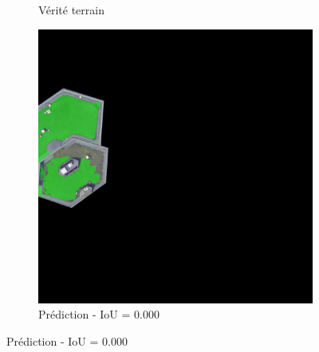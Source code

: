 \begin{figure}[H]
\begin{subfigure}{0.32\textwidth}
    \caption{Vérité terrain}
\end{subfigure}
\hfill
\begin{subfigure}{0.32\textwidth}
    \includegraphics[width=\textwidth]{02-main//figures/ch4/kfold_ensembles/segformer_tu-regnety_080.ra3_in1k/worst_cases/worst_4_iou0.000_25001117_tile_3_9_5ba8f7_overlay_pred.png}
    \caption{Prédiction - IoU = 0.000}
\end{subfigure}

\vspace{0.35cm}


\end{figure}
